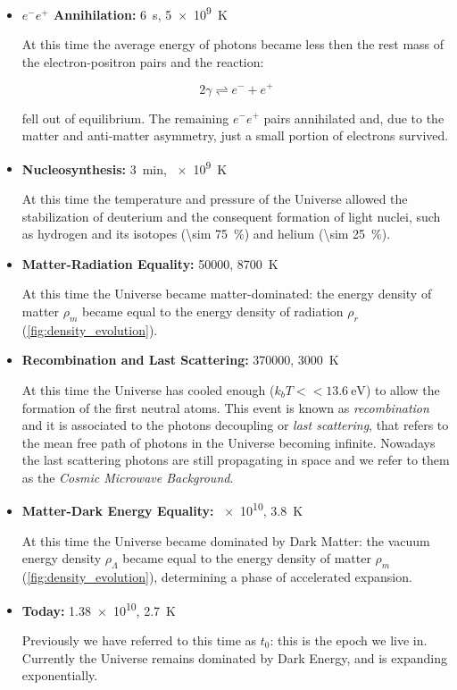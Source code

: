 \begin{itemize}
        \item \textbf{$e^-e^+$ Annihilation:} \SI{6}{\second},
        \SI{5e9}{\kelvin}

        At this time the average energy of photons became less then the rest mass
        of the electron-positron pairs and the reaction:

        \begin{equation}
                2\gamma \rightleftharpoons e^- + e^+
        \end{equation}

        fell out of equilibrium. The remaining $e^-e^+$ pairs annihilated and,
        due to the matter and anti-matter asymmetry, just a small portion
        of electrons survived.

        \item \textbf{Nucleosynthesis:} \SI{3}{\minute}, \SI{e9}{\kelvin}

        At this time the temperature and pressure of the Universe allowed
        the stabilization of deuterium and the consequent formation of
        light nuclei, such as hydrogen and its isotopes
        (\SI{\sim 75}{\percent}) and helium (\SI{\sim 25}{\percent}).

        \item \textbf{Matter-Radiation Equality:} \SI{50000}{\year},
        \SI{8700}{\kelvin}

        At this time the Universe became matter-dominated: the energy
        density of matter $\rho_m$ became equal to the energy density of
        radiation $\rho_r$ (\autoref{fig:density_evolution}).

        \item \textbf{Recombination and Last Scattering:} \SI{370000}{\year},
        \SI{3000}{\kelvin}

        At this time the Universe has cooled enough ($k_bT <<
        \SI{13.6}{\electronvolt}$) to allow the formation of the first
        neutral atoms. This event is known as \emph{recombination} and it is
        associated to the photons decoupling or \emph{last scattering}, that
        refers to the mean free path of photons in the Universe becoming
        infinite. Nowadays the last scattering photons are still propagating in
        space and we refer to them as the \emph{Cosmic Microwave Background}.

        \item \textbf{Matter-Dark Energy Equality:} \SI{e10}{\year},
        \SI{3.8}{\kelvin}

        At this time the Universe became dominated by Dark Matter: the
        vacuum energy density $\rho_\Lambda$ became equal to the energy density of
        matter $\rho_m$ (\autoref{fig:density_evolution}), determining a
        phase of accelerated expansion.

        \item \textbf{Today:} \SI{1.38e10}{\year}, \SI{2.7}{\kelvin}

        Previously we have referred to this time as $t_0$: this is
        the epoch we live in. Currently the Universe remains dominated by
        Dark Energy, and is expanding exponentially.
\end{itemize}

